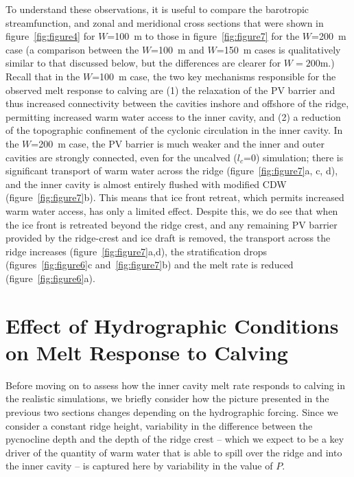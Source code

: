 \documentclass[draft]{agujournal2019}
\begin{document}
To understand these observations, it is useful to compare the barotropic streamfunction, and zonal and meridional cross sections that were shown in figure~\ref{fig:figure4} for $W$=100~m to those in figure~\ref{fig:figure7} for the $W$=200~m case (a comparison between the $W$=100~m and $W$=150~m cases is qualitatively similar to that discussed below, but the differences are clearer for $W = 200$m.) Recall that in the $W$=100~m case, the two key mechanisms responsible for the observed melt response to calving are (1) the relaxation of the PV barrier and thus increased connectivity between the cavities inshore and offshore of the ridge, permitting increased warm water access to the inner cavity, and (2) a reduction of the topographic confinement of the cyclonic circulation in the inner cavity. In the $W$=200~m case, the PV barrier is much weaker and the inner and outer cavities are strongly connected, even for the uncalved ($l_c$=0) simulation; there is significant transport of warm water across the ridge (figure~\ref{fig:figure7}a, c, d), and the inner cavity is almost entirely flushed with modified CDW (figure~\ref{fig:figure7}b). This means that ice front retreat, which permits increased warm water access, has only a limited effect. Despite this, we do see that when the ice front is retreated beyond the ridge crest, and any remaining PV barrier provided by the ridge-crest and ice draft is removed, the transport across the ridge increases (figure~\ref{fig:figure7}a,d), the stratification drops (figures~\ref{fig:figure6}c and~\ref{fig:figure7}b) and the melt rate is reduced (figure~\ref{fig:figure6}a).



\section{Effect of Hydrographic Conditions on Melt Response to Calving}\label{S:Results:P}
Before moving on to assess how the inner cavity melt rate responds to calving in the realistic simulations, we briefly consider how the picture presented in the previous two sections changes depending on the hydrographic forcing. Since we consider a constant ridge height, variability in the difference between the pycnocline depth and the depth of the ridge crest -- which we expect to be a key driver of the quantity of warm water that is able to spill over the ridge and into the inner cavity -- is captured here by variability in the value of $P$.
\end{document}
